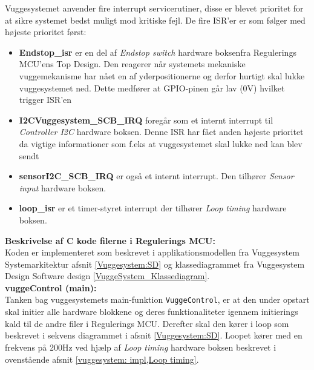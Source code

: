 
Vuggesystemet anvender fire interrupt servicerutiner, disse er blevet prioritet for at sikre systemet bedst muligt mod kritiske fejl. De fire ISR'er er som følger med højeste prioritet først:
\begin{itemize}
\item \textbf{Endstop\_isr} er en del af \textit{Endstop switch} hardware boksen\footnotemark  fra Regulerings MCU'ens Top Design. Den reagerer når systemets mekaniske vuggemekanisme har nået en af yderpositionerne og derfor hurtigt skal lukke vuggesystemet ned. Dette medfører at GPIO-pinen går lav (0V) hvilket trigger ISR'en
\item \textbf{I2CVuggesystem\_SCB\_IRQ} foregår som et internt interrupt til \textit{Controller I2C} hardware boksen. Denne ISR har fået anden højeste prioritet da vigtige informationer som f.eks at vuggesystemet skal lukke ned kan blev sendt
\item \textbf{sensorI2C\_SCB\_IRQ} er også et internt interrupt. Den tilhører \textit{Sensor input} hardware boksen. 
\item \textbf{loop\_isr} er et timer-styret interrupt der tilhører \textit{Loop timing} hardware boksen. 
\end{itemize}



\textbf{Beskrivelse af C kode filerne i Regulerings MCU:} \\
Koden er implementeret som beskrevet i applikationsmodellen fra Vuggesystem Systemarkitektur afsnit \vref{Vuggesystem:SD} og klassediagrammet fra Vuggesystem Design Software design \vref{VuggeSystem_Klassediagram}. \\


\textbf{vuggeControl (main):} \\
Tanken bag vuggesystemets main-funktion \verb+VuggeControl+, er at den under opstart skal initier alle hardware blokkene og deres funktionaliteter igennem initierings kald til de andre  filer i Regulerings MCU. Derefter skal den kører i loop som beskrevet i sekvens diagrammet i afsnit \vref{Vuggesystem:SD}. Loopet kører med en frekvens på 200Hz ved hjælp af \textit{Loop timing} hardware boksen beskrevet i ovenstående afsnit \vref{vuggesystem: impl,Loop timing}. \\ 


